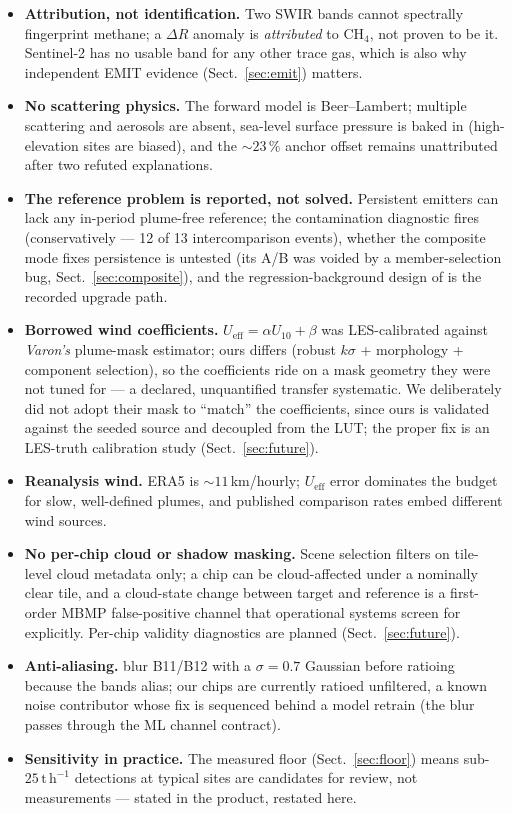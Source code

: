 \documentclass[11pt]{article}
\newcommand{\dR}{\Delta R}
\newcommand{\perh}{\ensuremath{\,\mathrm{t\,h^{-1}}}}
\begin{document}
\begin{itemize}\itemsep2pt
\item \textbf{Attribution, not identification.} Two SWIR bands cannot
spectrally fingerprint methane; a $\dR$ anomaly is \emph{attributed} to
CH$_4$, not proven to be it. Sentinel-2 has no usable band for any other
trace gas, which is also why independent EMIT evidence
(Sect.~\ref{sec:emit}) matters.
\item \textbf{No scattering physics.} The forward model is Beer--Lambert;
multiple scattering and aerosols are absent, sea-level surface pressure is
baked in (high-elevation sites are biased), and the ${\sim}23\,\%$ anchor
offset remains unattributed after two refuted explanations.
\item \textbf{The reference problem is reported, not solved.} Persistent
emitters can lack any in-period plume-free reference; the contamination
diagnostic fires (conservatively --- 12 of 13 intercomparison events),
whether the composite mode fixes persistence is untested (its A/B was
voided by a member-selection bug, Sect.~\ref{sec:composite}), and the
regression-background design of
\citet{ehret2022} is the recorded upgrade path.
\item \textbf{Borrowed wind coefficients.} $U_{\mathrm{eff}} = \alpha
U_{10} + \beta$ was LES-calibrated against \emph{Varon's} plume-mask
estimator; ours differs (robust $k\sigma$ + morphology + component
selection), so the coefficients ride on a mask geometry they were not
tuned for --- a declared, unquantified transfer systematic. We
deliberately did not adopt their mask to ``match'' the coefficients, since
ours is validated against the seeded source and decoupled from the LUT;
the proper fix is an LES-truth calibration study
(Sect.~\ref{sec:future}).
\item \textbf{Reanalysis wind.} ERA5 is ${\sim}11$\,km/hourly;
$U_{\mathrm{eff}}$ error dominates the budget for slow, well-defined
plumes, and published comparison rates embed different wind sources.
\item \textbf{No per-chip cloud or shadow masking.} Scene selection
filters on tile-level cloud metadata only; a chip can be cloud-affected
under a nominally clear tile, and a cloud-state change between target and
reference is a first-order MBMP false-positive channel that operational
systems screen for explicitly. Per-chip validity diagnostics are planned
(Sect.~\ref{sec:future}).
\item \textbf{Anti-aliasing.} \citet{ehret2022} blur B11/B12 with a
$\sigma{=}0.7$ Gaussian before ratioing because the bands alias; our chips
are currently ratioed unfiltered, a known noise contributor whose fix is
sequenced behind a model retrain (the blur passes through the ML channel
contract).
\item \textbf{Sensitivity in practice.} The measured floor
(Sect.~\ref{sec:floor}) means sub-$25\perh$ detections at typical sites
are candidates for review, not measurements --- stated in the product,
restated here.
\end{itemize}
\end{document}
